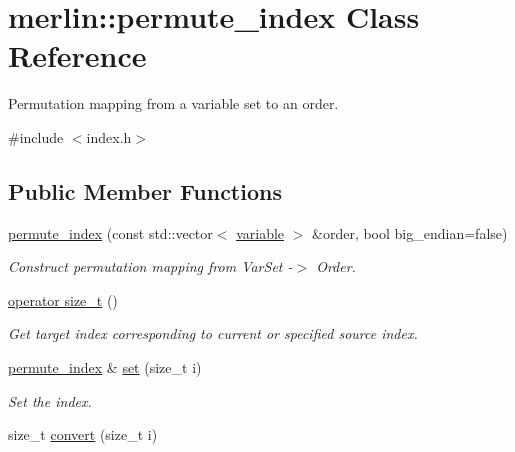 \hypertarget{classmerlin_1_1permute__index}{}\section{merlin\+:\+:permute\+\_\+index Class Reference}
\label{classmerlin_1_1permute__index}


Permutation mapping from a variable set to an order.  




{\ttfamily \#include $<$index.\+h$>$}

\subsection*{Public Member Functions}
\begin{DoxyCompactItemize}
\item 
\hyperlink{classmerlin_1_1permute__index_ae8aa08b953ea59704f5035ce0f94063b}{permute\+\_\+index} (const std\+::vector$<$ \hyperlink{classmerlin_1_1variable}{variable} $>$ \&order, bool big\+\_\+endian=false)\hypertarget{classmerlin_1_1permute__index_ae8aa08b953ea59704f5035ce0f94063b}{}\label{classmerlin_1_1permute__index_ae8aa08b953ea59704f5035ce0f94063b}

\begin{DoxyCompactList}\small\item\em Construct permutation mapping from Var\+Set -\/$>$ Order. \end{DoxyCompactList}\item 
\hyperlink{classmerlin_1_1permute__index_a20c91878fc17cffe106eb53dedc0689c}{operator size\+\_\+t} ()\hypertarget{classmerlin_1_1permute__index_a20c91878fc17cffe106eb53dedc0689c}{}\label{classmerlin_1_1permute__index_a20c91878fc17cffe106eb53dedc0689c}

\begin{DoxyCompactList}\small\item\em Get target index corresponding to current or specified source index. \end{DoxyCompactList}\item 
\hyperlink{classmerlin_1_1permute__index}{permute\+\_\+index} \& \hyperlink{classmerlin_1_1permute__index_ae83e48c24acec69dc39f70804ae61ca9}{set} (size\+\_\+t i)\hypertarget{classmerlin_1_1permute__index_ae83e48c24acec69dc39f70804ae61ca9}{}\label{classmerlin_1_1permute__index_ae83e48c24acec69dc39f70804ae61ca9}

\begin{DoxyCompactList}\small\item\em Set the index. \end{DoxyCompactList}\item 
size\+\_\+t \hyperlink{classmerlin_1_1permute__index_ace987194d5be9586ead5c7862fc41d4b}{convert} (size\+\_\+t i)\hypertarget{classmerlin_1_1permute__index_ace987194d5be9586ead5c7862fc41d4b}{}\label{classmerlin_1_1permute__index_ace987194d5be9586ead5c7862fc41d4b}


\end{DoxyCompactItemize}
